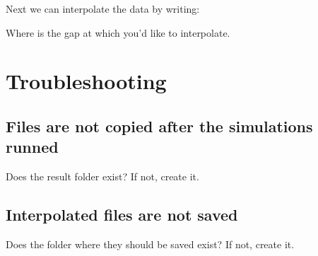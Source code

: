 \documentclass[letterpaper,10pt,english]{sphinxmanual}
\begin{document}
\begin{sphinxVerbatim}[commandchars=\\\{\}]
     
\end{sphinxVerbatim}

\sphinxAtStartPar
Next we can interpolate the data by writing:

\begin{sphinxVerbatim}[commandchars=\\\{\}]
          
\end{sphinxVerbatim}

\sphinxAtStartPar
Where  is the gap at which you’d like to interpolate.


\section{Troubleshooting}
\label{\detokenize{tutorial:troubleshooting}}

\subsection{Files are not copied after the simulations runned}
\label{\detokenize{tutorial:files-are-not-copied-after-the-simulations-runned}}
\sphinxAtStartPar
Does the result folder exist? If not, create it.


\subsection{Interpolated files are not saved}
\label{\detokenize{tutorial:interpolated-files-are-not-saved}}
\sphinxAtStartPar
Does the folder where they should be saved exist? If not, create it.
\end{document}
